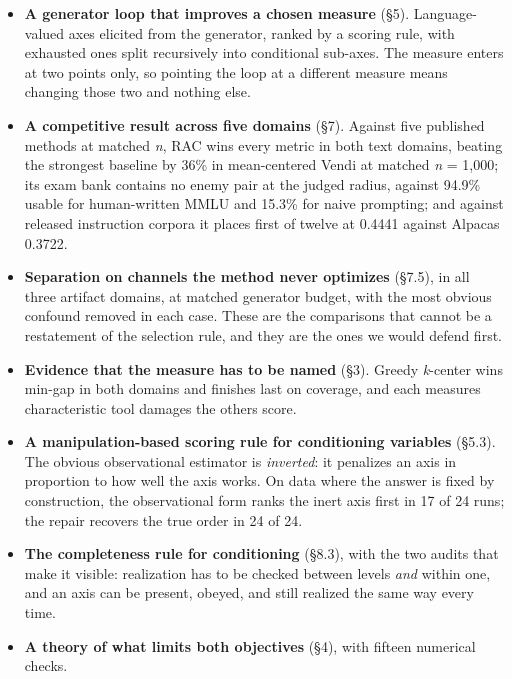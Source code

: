 \documentclass[
  10pt,
]{article}
\providecommand{\tightlist}{%
  \setlength{\itemsep}{0pt}\setlength{\parskip}{0pt}}
\theoremstyle{plain}
\theoremstyle{definition}
\providecommand{\tightlist}{\setlength{\itemsep}{0pt}\setlength{\parskip}{0pt}}
\begin{document}
\begin{itemize}
\tightlist
\item
  \textbf{A generator loop that improves a chosen measure} (§5).
  Language-valued axes elicited from the generator, ranked by a scoring
  rule, with exhausted ones split recursively into conditional sub-axes.
  The measure enters at two points only, so pointing the loop at a
  different measure means changing those two and nothing else.
\item
  \textbf{A competitive result across five domains} (§7). Against five
  published methods at matched \emph{n}, RAC wins every metric in both
  text domains, beating the strongest baseline by 36\% in mean-centered
  Vendi at matched \emph{n} = 1,000; its exam bank contains no enemy
  pair at the judged radius, against 94.9\% usable for human-written
  MMLU and 15.3\% for naive prompting; and against released instruction
  corpora it places first of twelve at 0.4441 against
  Alpaca\textquotesingle s 0.3722.
\item
  \textbf{Separation on channels the method never optimizes} (§7.5), in
  all three artifact domains, at matched generator budget, with the most
  obvious confound removed in each case. These are the comparisons that
  cannot be a restatement of the selection rule, and they are the ones
  we would defend first.
\item
  \textbf{Evidence that the measure has to be named} (§3). Greedy
  \emph{k}-center wins min-gap in both domains and finishes last on
  coverage, and each measure\textquotesingle s characteristic tool
  damages the other\textquotesingle s score.
\item
  \textbf{A manipulation-based scoring rule for conditioning variables}
  (§5.3). The obvious observational estimator is \emph{inverted}: it
  penalizes an axis in proportion to how well the axis works. On data
  where the answer is fixed by construction, the observational form
  ranks the inert axis first in 17 of 24 runs; the repair recovers the
  true order in 24 of 24.
\item
  \textbf{The completeness rule for conditioning} (§8.3), with the two
  audits that make it visible: realization has to be checked between
  levels \emph{and} within one, and an axis can be present, obeyed, and
  still realized the same way every time.
\item
  \textbf{A theory of what limits both objectives} (§4), with fifteen
  numerical checks.
\end{itemize}
\end{document}
